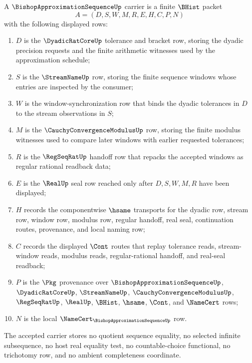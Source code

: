 \begin{definition}
\label{def:bishop-approximation-sequence-carrier}
A $\BishopApproximationSequenceUp$ carrier is a finite $\BHist$ packet
$$
A=(D,S,W,M,R,E,H,C,P,N)
$$
with the following displayed rows:
\begin{enumerate}
\item $D$ is the $\DyadicRatCoreUp$ tolerance and bracket row, storing the dyadic precision requests and the finite arithmetic witnesses used by the approximation schedule;
\item $S$ is the $\StreamNameUp$ row, storing the finite sequence windows whose entries are inspected by the consumer;
\item $W$ is the window-synchronization row that binds the dyadic tolerances in $D$ to the stream observations in $S$;
\item $M$ is the $\CauchyConvergenceModulusUp$ row, storing the finite modulus witnesses used to compare later windows with earlier requested tolerances;
\item $R$ is the $\RegSeqRatUp$ handoff row that repacks the accepted windows as regular rational readback data;
\item $E$ is the $\RealUp$ seal row reached only after $D,S,W,M,R$ have been displayed;
\item $H$ records the componentwise $\hsame$ transports for the dyadic row, stream row, window row, modulus row, regular handoff, real seal, continuation routes, provenance, and local naming row;
\item $C$ records the displayed $\Cont$ routes that replay tolerance reads, stream-window reads, modulus reads, regular-rational handoff, and real-seal readback;
\item $P$ is the $\Pkg$ provenance over $\BishopApproximationSequenceUp$, $\DyadicRatCoreUp$, $\StreamNameUp$, $\CauchyConvergenceModulusUp$, $\RegSeqRatUp$, $\RealUp$, $\BHist$, $\hsame$, $\Cont$, and $\NameCert$ rows;
\item $N$ is the local $\NameCert_{\BishopApproximationSequenceUp}$ row.
\end{enumerate}
The accepted carrier stores no quotient sequence equality, no selected infinite subsequence, no host real equality test, no countable-choice functional, no trichotomy row, and no ambient completeness coordinate.
\end{definition}

